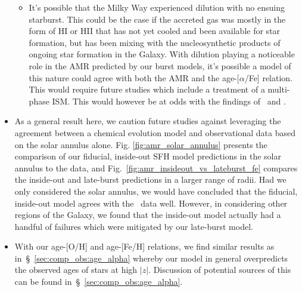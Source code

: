 \documentclass[fleqn, usenatbib]{mnras}
\begin{document}
\begin{itemize}
\begin{itemize}
		\item It's possible that the Milky Way experienced dilution with no 
		ensuing starburst. This could be the case if the accreted gas was 
		mostly in the form of HI or HII that has not yet cooled and been 
		available for star formation, but has been mixing with the 
		nucleosynthetic products of ongoing star formation in the Galaxy. With 
		dilution playing a noticeable role in the AMR predicted by our burst 
		models, it's possible a model of this nature could agree with both 
		the AMR and the age-[$\alpha$/Fe] relation. This would require 
		future studies which include a treatment of a multi-phase ISM. This 
		would however be at odds with the findings of~\citet{Mor2019} and 
		\citet{Isern2019}. 
	\end{itemize} 

	\item As a general result here, we caution future studies against 
	leveraging the agreement between a chemical evolution model and 
	observational data based on the solar annulus alone. Fig. 
	\ref{fig:amr_solar_annulus} presents the comparison of our fiducial, 
	inside-out SFH model predictions in the solar annulus to the 
	\citet{Feuillet2019} data, and Fig.~\ref{fig:amr_insideout_vs_lateburst_fe} 
	compares the inside-out and late-burst predictions in a larger range of 
	radii. Had we only considered the solar annulus, we would have concluded 
	that the fiducial, inside-out model agrees with the~\citet{Feuillet2019} 
	data well. However, in considering other regions of the Galaxy, we found 
	that the inside-out model actually had a handful of failures which were 
	mitigated by our late-burst model. 

	\item With our age-[O/H] and age-[Fe/H] relations, we find similar results 
	as in~\S~\ref{sec:comp_obs:age_alpha} whereby our model 
	in general overpredicts the observed ages of stars at high 
	$\left|z\right|$. Discussion of potential sources of this can be found 
	in~\S~\ref{sec:comp_obs:age_alpha}. 
\end{itemize} 
\end{document}

